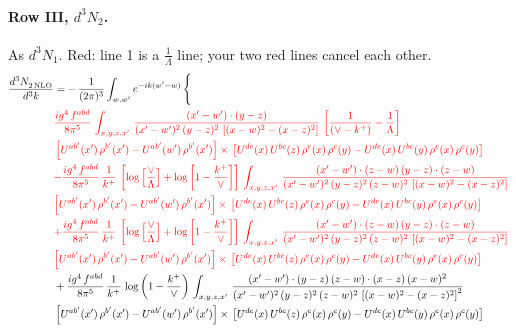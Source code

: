 \documentclass[10pt]{article}
\numberwithin{equation}{section}
\newcommand{\old}[1]{{\color{red}#1}}
\newcommand{\rc}{\color{red}}
\begin{document}
\paragraph{Row III, $d^3N_2$.}
As $d^3N_1$. \old{Red}: line 1 is a $\frac{1}{\Lambda}$ line; your two red lines cancel each other.
\begin{align}
   \frac{d^{3}N_{2\,\rm NLO}^{\rm}}{d^{3}k}  & =  -\,\frac{1}{(2\pi)^{3}}  \int_{w, w^\prime} e^{-ik(w^\prime-w)}\, \Bigg\{\notag \\
& \rc  \frac{ig^{4}\, f^{abd}}{8\pi^{5}}\, \int_{x,y,z,x'}\,\frac{(x'-w')\cdot (y-z)}{(x'-w')^{2}\, (y-z)^{2}\,\left[(x-w)^{2}-(x-z)^{2}\right]}\,\left[\frac{1}{(\vee-k^{+})}-\frac{1}{\Lambda}\right] \notag \\ & \rc  \left[U^{ab'}(x')\,\rho^{b'}(x')-U^{ab'}(w')\, \rho^{b'}(x')\right]\times\,\left[U^{de}(x)\,U^{bc}(z)\, \rho^{e}(x)\,\rho^{c}(y)-U^{de}(x)\,U^{bc}(y)\,\rho^{e}(x)\,\rho^{c}(y)\right] \notag \\
& \rc  {\color{red}-\frac{ig^{4}\, f^{abd}}{8\pi^{5}}\, \frac{1}{k^{+}}\, \left[\log{\left[\frac{\vee}{\Lambda}\right]} + \log{\left[1-\frac{k^{+}}{\vee}\right]}\right]\,\int_{x,y,z,x'}\,\frac{(x'-w')\cdot (z-w)\, (y-z)\cdot (z-w)}{(x'-w')^{2}\, (y-z)^{2}\, (z-w)^{2}\,\left[(x-w)^{2}-(x-z)^{2}\right]}\,} \notag \\ & \rc  {\color{red}\left[U^{ab'}(x')\,\rho^{b'}(x')-U^{ab'}(w')\, \rho^{b'}(x')\right]\times\,\left[U^{de}(x)\,U^{bc}(z)\, \rho^{e}(x)\,\rho^{c}(y)-U^{de}(x)\,U^{bc}(y)\,\rho^{e}(x)\,\rho^{c}(y)\right]} \notag \\
& \rc  {\color{red}+ \frac{ig^{4}\, f^{abd}}{8\pi^{5}}\, \frac{1}{k^{+}}\,\left[\log{\left[\frac{\vee}{\Lambda}\right]} + \log{\left[1-\frac{k^{+}}{\vee}\right]}\right]\,\int_{x,y,z,x'}\,\frac{(x'-w')\cdot (z-w)\, (y-z)\cdot (z-w)}{(x'-w')^{2}\, (y-z)^{2}\, (z-w)^{2}\,\left[(x-w)^{2}-(x-z)^{2}\right]}} \notag \\ & \rc  {\color{red}\left[U^{ab'}(x')\,\rho^{b'}(x')-U^{ab'}(w')\, \rho^{b'}(x')\right]\times\,\left[U^{de}(x)\,U^{bc}(z)\, \rho^{e}(x)\,\rho^{c}(y)-U^{de}(x)\,U^{bc}(y)\,\rho^{e}(x)\,\rho^{c}(y)\right]} \notag \\
&  + \frac{ig^{4}\, f^{abd}}{8\pi^{5}}\, \frac{1}{k^{+}}\,\log{\left(1-\frac{k^{+}}{\vee}\right)}\, \int_{x,y,z,x'}\,\frac{(x'-w')\cdot  (y-z)\, (z-w)\cdot (x-z)\, (x-w)^{2}}{(x'-w')^{2}\, (y-z)^{2}\, (z-w)^{2}\,\left[(x-w)^{2}-(x-z)^{2}\right]^{2}}\, \notag \\ & \left[U^{ab'}(x')\,\rho^{b'}(x')-U^{ab'}(w')\, \rho^{b'}(x')\right]\times\,\left[U^{de}(x)\,U^{bc}(z)\, \rho^{e}(x)\,\rho^{c}(y)-U^{de}(x)\,U^{bc}(y)\,\rho^{e}(x)\,\rho^{c}(y)\right] \notag \\

\end{align}
\end{document}
